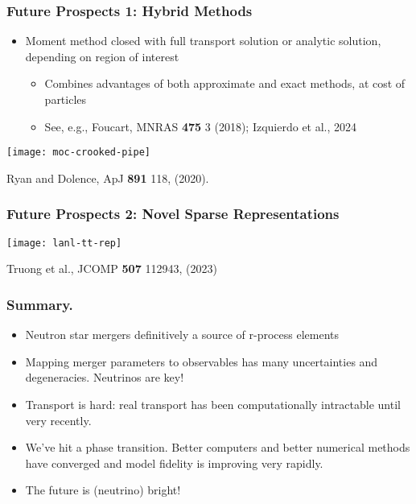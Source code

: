 \documentclass[]{beamer}
\begin{document}
\begin{frame}
  \frametitle{Future Prospects 1: Hybrid Methods}
  \begin{itemize}
  \item Moment method closed with full transport solution or analytic
    solution, depending on region of interest
    \begin{itemize}
    \item Combines advantages of both approximate and exact methods, at
      cost of particles
    \item See, e.g., Foucart, MNRAS \textbf{475} 3 (2018); Izquierdo et al., 2024
    \end{itemize}
  \end{itemize}
  \begin{center}
      \texttt{[image: moc-crooked-pipe]}
    \end{center}
    {\footnotesize Ryan and Dolence, ApJ \textbf{891} 118, (2020).}  
  \end{frame}
\begin{frame}
  \frametitle{Future Prospects 2: Novel Sparse Representations}
  \begin{center}
    \texttt{[image: lanl-tt-rep]}
  \end{center}
  \begin{footnotesize}
    Truong et al., JCOMP \textbf{507} 112943, (2023)
  \end{footnotesize}
\end{frame}

\begin{frame}
  \frametitle{Summary.}
  \begin{itemize}
  \item Neutron star mergers definitively a source of r-process elements
  \item Mapping merger parameters to observables has many
    uncertainties and degeneracies. Neutrinos are key!
  \item Transport is hard: real transport has been computationally
    intractable until very recently.
  \item We've hit a phase transition. Better computers and better
    numerical methods have converged and model fidelity is improving
    very rapidly.
  \item The future is (neutrino) bright!
  \end{itemize}
\end{frame}
\end{document}
